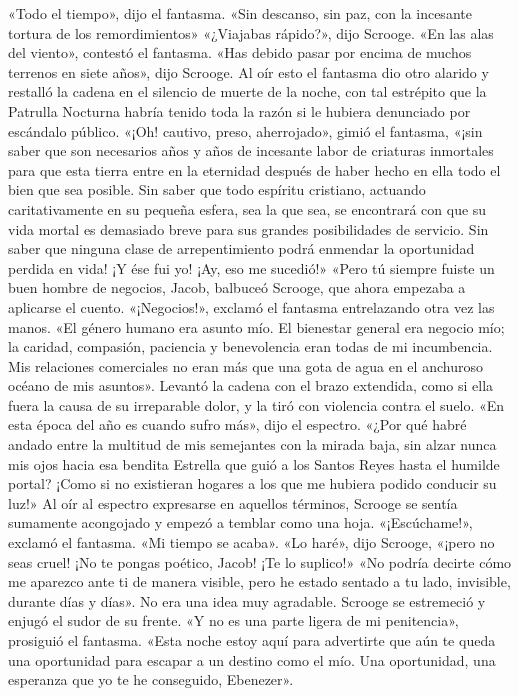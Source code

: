 \documentclass{novela}
\begin{document}
 «Todo el tiempo», dijo el fantasma. «Sin descanso, sin paz, con la incesante tortura de los remordimientos»
 «¿Viajabas rápido?», dijo Scrooge.
 «En las alas del viento», contestó el fantasma.
 «Has debido pasar por encima de muchos terrenos en siete años», dijo Scrooge.
 Al oír esto el fantasma dio otro alarido y restalló la cadena en el silencio de muerte de la noche, con tal estrépito que la Patrulla Nocturna habría tenido toda la razón si le hubiera denunciado por escándalo público.
 «¡Oh! cautivo, preso, aherrojado», gimió el fantasma, «¡sin saber que son necesarios años y años de incesante labor de criaturas inmortales para que esta tierra entre en la eternidad después de haber hecho en ella todo el bien que sea posible. Sin saber que todo espíritu cristiano, actuando caritativamente en su pequeña esfera, sea la que sea, se encontrará con que su vida mortal es demasiado breve para sus grandes posibilidades de servicio. Sin saber que ninguna clase de arrepentimiento podrá enmendar la oportunidad perdida en vida! ¡Y ése fui yo! ¡Ay, eso me sucedió!»
 «Pero tú siempre fuiste un buen hombre de negocios, Jacob, balbuceó Scrooge, que ahora empezaba a aplicarse el cuento.
 «¡Negocios!», exclamó el fantasma entrelazando otra vez las manos. «El género humano era asunto mío. El bienestar general era negocio mío; la caridad, compasión, paciencia y benevolencia eran todas de mi incumbencia. Mis relaciones comerciales no eran más que una gota de agua en el anchuroso océano de mis asuntos».
 Levantó la cadena con el brazo extendida, como si ella fuera la causa de su irreparable dolor, y la tiró con violencia contra el suelo.
 «En esta época del año es cuando sufro más», dijo el espectro. «¿Por qué habré andado entre la multitud de mis semejantes con la mirada baja, sin alzar nunca mis ojos hacia esa bendita Estrella que guió a los Santos Reyes hasta el humilde portal? ¡Como si no existieran hogares a los que me hubiera podido conducir su luz!»
 Al oír al espectro expresarse en aquellos términos, Scrooge se sentía sumamente acongojado y empezó a temblar como una hoja.
 «¡Escúchame!», exclamó el fantasma. «Mi tiempo se acaba».
 «Lo haré», dijo Scrooge, «¡pero no seas cruel! ¡No te pongas poético, Jacob! ¡Te lo suplico!»
 «No podría decirte cómo me aparezco ante ti de manera visible, pero he estado sentado a tu lado, invisible, durante días y días».
 No era una idea muy agradable. Scrooge se estremeció y enjugó el sudor de su frente.
 «Y no es una parte ligera de mi penitencia», prosiguió el fantasma. «Esta noche estoy aquí para advertirte que aún te queda una oportunidad para escapar a un destino como el mío. Una oportunidad, una esperanza que yo te he conseguido, Ebenezer».
\end{document}
